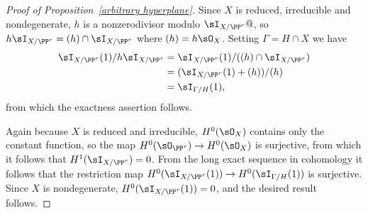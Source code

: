 \begin{proof}[Proof of Proposition~\ref{arbitrary hyperplane}]
Since
$X$ is reduced, irreducible and  \null nondegenerate,
$h$ is a nonzerodivisor modulo
$\sI_{X/\PP^r}@$, so $h\sI_{X/\PP^r} = (h)\cap \sI_{X/\PP^r}$ where
$(h) = h\sO_{X}$.
Setting $\Gamma = {H\cap X}$
we have
$$
\begin{aligned}
\sI_{X/\PP^r}(1)/h\sI_{X/\PP^r} &= \sI_{X/\PP^r}(1)/((h)\cap\sI_{X/\PP^r})\\
 &=(\sI_{X/\PP^r}(1)+(h))/(h)\\
 &= \sI_{\Gamma/H}(1),
\end{aligned}
$$
from which the exactness assertion follows.

 Again because $X$ is reduced and irreducible, $H^0(\sO_X)$ contains only the constant function, so the map $H^0(\sO_{\PP^r}) \to H^0(\sO_X)$ is surjective,
from which it follows that $H^1(\sI_{X/\PP^r}) = 0$. From the long exact sequence in cohomology it follows that
 the restriction map $H^0(\sI_{X/\PP^r}(1))\to H^0(\sI_{\Gamma/H}(1))$ is surjective. Since
$X$ is nondegenerate, $H^0(\sI_{X/\PP^r}(1)) = 0$, and the desired result follows.
\unif
\end{proof}


